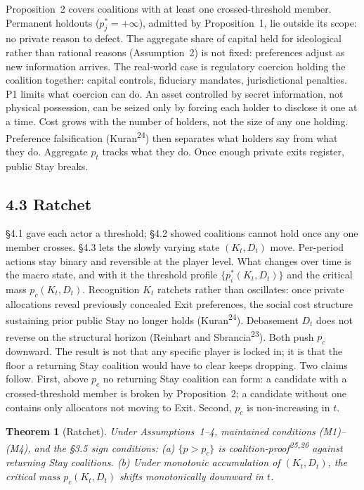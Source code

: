 \documentclass[12pt]{article}
\newtheorem{theorem}{Theorem}
\theoremstyle{definition}
\theoremstyle{remark}
\begin{document}
Proposition~2 covers coalitions with at least one crossed-threshold member. Permanent holdouts ($p_j^* = +\infty$), admitted by Proposition~1, lie outside its scope: no private reason to defect. The aggregate share of capital held for ideological rather than rational reasons (Assumption~2) is not fixed: preferences adjust as new information arrives. The real-world case is regulatory coercion holding the coalition together: capital controls, fiduciary mandates, jurisdictional penalties. P1 limits what coercion can do. An asset controlled by secret information, not physical possession, can be seized only by forcing each holder to disclose it one at a time. Cost grows with the number of holders, not the size of any one holding. Preference falsification (Kuran\textsuperscript{24}) then separates what holders say from what they do. Aggregate $p_t$ tracks what they do. Once enough private exits register, public Stay breaks.

\subsection{4.3 Ratchet}

\S4.1 gave each actor a threshold; \S4.2 showed coalitions cannot hold once any one member crosses. \S4.3 lets the slowly varying state $(K_t, D_t)$ move. Per-period actions stay binary and reversible at the player level. What changes over time is the macro state, and with it the threshold profile $\{p_i^*(K_t, D_t)\}$ and the critical mass $p_c(K_t, D_t)$. Recognition $K_t$ ratchets rather than oscillates: once private allocations reveal previously concealed Exit preferences, the social cost structure sustaining prior public Stay no longer holds (Kuran\textsuperscript{24}). Debasement $D_t$ does not reverse on the structural horizon (Reinhart and Sbrancia\textsuperscript{23}). Both push $p_c$ downward. The result is not that any specific player is locked in; it is that the floor a returning Stay coalition would have to clear keeps dropping. Two claims follow. First, above $p_c$ no returning Stay coalition can form: a candidate with a crossed-threshold member is broken by Proposition~2; a candidate without one contains only allocators not moving to Exit. Second, $p_c$ is non-increasing in $t$.

\begin{theorem}[Ratchet]
Under Assumptions~1--4, maintained conditions (M1)--(M4), and
the \S3.5 sign conditions: (a) $\{p > p_c\}$
is coalition-proof\textsuperscript{25,26} against returning Stay coalitions. (b) Under
monotonic accumulation of $(K_t, D_t)$, the critical mass
$p_c(K_t, D_t)$ shifts monotonically downward in $t$.
\end{theorem}
\end{document}
